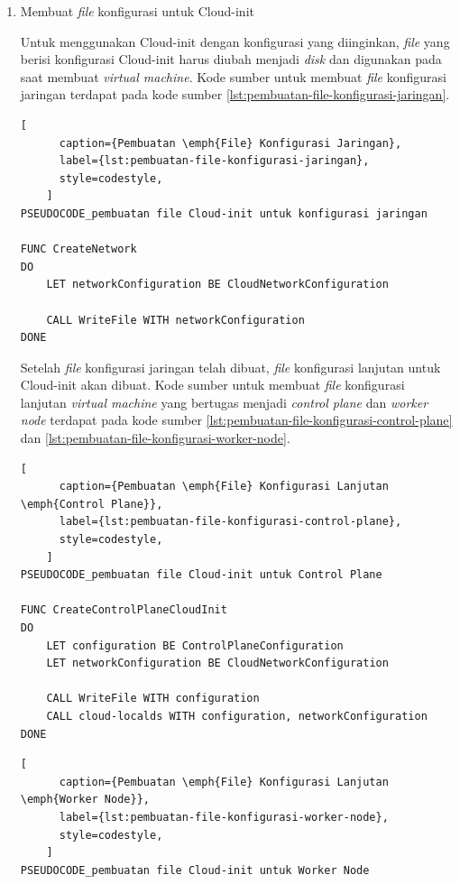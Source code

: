\begin{enumerate}

  \item Membuat \emph{file} konfigurasi untuk Cloud-init

    Untuk menggunakan Cloud-init dengan konfigurasi yang diinginkan, \emph{file}
    yang berisi konfigurasi Cloud-init harus diubah menjadi \emph{disk} dan digunakan
    pada saat membuat \emph{virtual machine}. Kode sumber untuk membuat \emph{file}
    konfigurasi jaringan terdapat pada kode sumber \ref{lst:pembuatan-file-konfigurasi-jaringan}.

    \begin{lstlisting}[
      caption={Pembuatan \emph{File} Konfigurasi Jaringan},
      label={lst:pembuatan-file-konfigurasi-jaringan},
      style=codestyle,
    ]
PSEUDOCODE_pembuatan file Cloud-init untuk konfigurasi jaringan

FUNC CreateNetwork
DO
    LET networkConfiguration BE CloudNetworkConfiguration

    CALL WriteFile WITH networkConfiguration
DONE
    \end{lstlisting}

    Setelah \emph{file} konfigurasi jaringan telah dibuat, \emph{file}
    konfigurasi lanjutan untuk Cloud-init akan dibuat. Kode sumber untuk membuat
    \emph{file} konfigurasi lanjutan \emph{virtual machine} yang bertugas
    menjadi \emph{control plane} dan \emph{worker node} terdapat pada kode sumber
    \ref{lst:pembuatan-file-konfigurasi-control-plane} dan \ref{lst:pembuatan-file-konfigurasi-worker-node}.

    \begin{lstlisting}[
      caption={Pembuatan \emph{File} Konfigurasi Lanjutan \emph{Control Plane}},
      label={lst:pembuatan-file-konfigurasi-control-plane},
      style=codestyle,
    ]
PSEUDOCODE_pembuatan file Cloud-init untuk Control Plane

FUNC CreateControlPlaneCloudInit
DO
    LET configuration BE ControlPlaneConfiguration
    LET networkConfiguration BE CloudNetworkConfiguration
    
    CALL WriteFile WITH configuration
    CALL cloud-localds WITH configuration, networkConfiguration
DONE
    \end{lstlisting}

    \begin{lstlisting}[
      caption={Pembuatan \emph{File} Konfigurasi Lanjutan \emph{Worker Node}},
      label={lst:pembuatan-file-konfigurasi-worker-node},
      style=codestyle,
    ]
PSEUDOCODE_pembuatan file Cloud-init untuk Worker Node


\end{lstlisting}
\end{enumerate}
